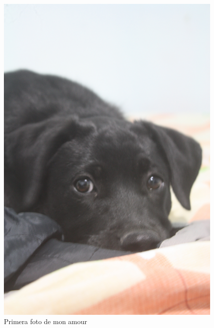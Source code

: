 \documentclass[12pt,letterpaper,oneside]{book}
\begin{document}
\begin{figure}[ht]
\begin{center}
\includegraphics[scale=.08]{img/milla.jpg}
\caption{Primera foto de mon amour}
\label{milla_0}
\end{center}

\end{figure}
\end{document}
